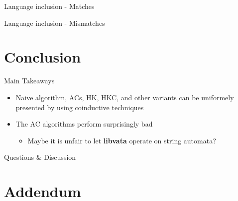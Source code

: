 \documentclass[compress]{beamer}
\begin{document}
\begin{frame}{Language inclusion - Matches}
  \begin{figure}

    

  \end{figure}
\end{frame}

\begin{frame}{Language inclusion - Mismatches}
  \begin{figure}

    \hspace*{0.95cm}
    

  \end{figure}
\end{frame}

\section{Conclusion}

\begin{frame}{Main Takeaways}
  \begin{itemize}
    \item<1-> Naive algorithm, ACs, HK, HKC, and other variants can be uniformely
      presented by using coinductive techniques
    \item<2-> The AC algorithms perform surprisingly bad
      \begin{itemize}
        \item Maybe it is unfair to let \textbf{libvata} operate on string automata?
      \end{itemize}
  \end{itemize}
\end{frame}

\begin{frame}
  \begin{center}
    \huge{Questions \& Discussion}
  \end{center}
\end{frame}

\section*{Addendum}
\end{document}
